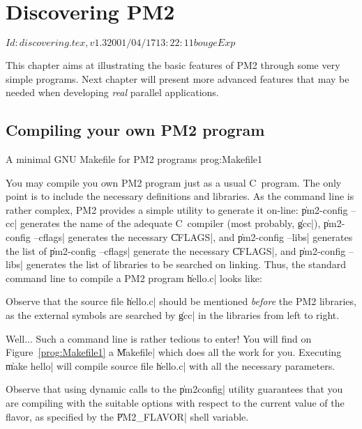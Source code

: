 \chapter{Discovering PM2}

\stamp $Id: discovering.tex,v 1.3 2001/04/17 13:22:11 bouge Exp $

This chapter aims at illustrating the basic features of PM2 through
some very simple programs. Next chapter will present more advanced
features that may be needed when developing \emph{real} parallel
applications.

\section{Compiling your own PM2 program}

 {A minimal GNU Makefile for PM2
  programs} {prog:Makefile1}

You may compile you own PM2 program just as a usual C~program. The
only point is to include the necessary definitions and libraries.  As
the command line is rather complex, PM2 provides a simple utility to
generate it on-line: \|pm2-config --cc| generates the name of the
adequate C~compiler (most probably, \|gcc|), \|pm2-config --cflags|
generates the necessary \|CFLAGS|, and \|pm2-config --libs| generates
the list of \|pm2-config --cflags| generate the necessary \|CFLAGS|,
and \|pm2-config --libs| generates the list of libraries to be
searched on linking. Thus, the standard command line to compile a PM2
program \|hello.c| looks like:
Observe that the source file \|hello.c| should be mentioned
\emph{before} the PM2 libraries, as the external symbols are searched by
\|gcc| in the libraries from left to right.

Well... Such a command line is rather tedious to enter! You will find
on Figure~\ref{prog:Makefile1} a \|Makefile| which does all the work
for you. Executing \|make hello| will compile source file \|hello.c|
with all the necessary parameters.

Observe that using dynamic calls to the \|pm2config| utility guarantees
that you are compiling with the suitable options with respect to the
current value of the flavor, as specified by the \|PM2_FLAVOR|
shell variable.


